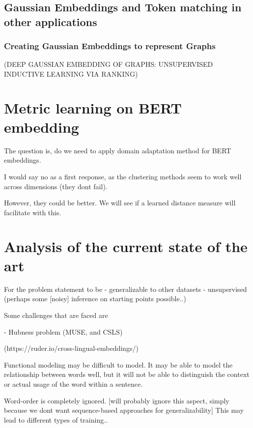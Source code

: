 \documentclass[a4paper,12pt,twoside,openright]{report}
\begin{document}
\section{Gaussian Embeddings and Token matching in other applications}

\subsection{Creating Gaussian Embeddings to represent Graphs}
(DEEP GAUSSIAN EMBEDDING OF GRAPHS: UNSUPERVISED INDUCTIVE LEARNING VIA RANKING)


\chapter{Metric learning on BERT embedding}

The question is, do we need to apply domain adaptation method for BERT embeddings.

I would say no as a first response, as the clustering methods seem to work well across dimensions (they dont fail).

However, they could be better. 
We will see if a learned distance measure will facilitate with this.





\chapter{Analysis of the current state of the art}

For the problem statement to be
- generalizable to other datasets
- unsupervised (perhaps some [noisy] inference on starting points possible..)

Some challenges that are faced are

- Hubness problem (MUSE, and CSLS)

(https://ruder.io/cross-lingual-embeddings/)

Functional modeling may be difficult to model.
It may be able to model the relationship between words well, but it will not be able to distinguish the context or actual usage of the word within a sentence.

Word-order is completely ignored. [will probably ignore this aspect, simply because we dont want sequence-based approaches for generalizability]
This may lead to different types of training.. 
\end{document}
